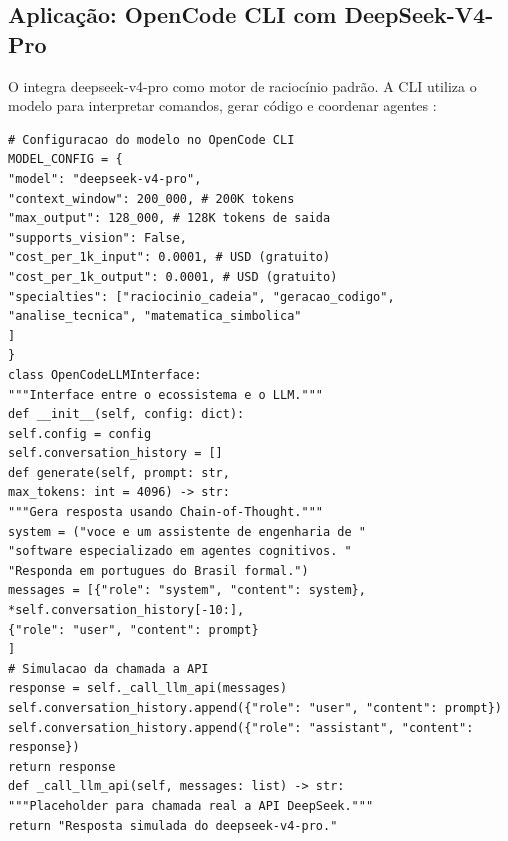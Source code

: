 \subsection{Aplicação: OpenCode CLI com DeepSeek-V4-Pro}
O \opencodeeco{} integra deepseek-v4-pro como motor de raciocínio padrão.
A CLI utiliza o modelo para interpretar comandos, gerar código e coordenar
agentes \cite{opencode2026ecosystem}:
\begin{lstlisting}[style=pythonstyle]
# Configuracao do modelo no OpenCode CLI
MODEL_CONFIG = {
"model": "deepseek-v4-pro",
"context_window": 200_000, # 200K tokens
"max_output": 128_000, # 128K tokens de saida
"supports_vision": False,
"cost_per_1k_input": 0.0001, # USD (gratuito)
"cost_per_1k_output": 0.0001, # USD (gratuito)
"specialties": ["raciocinio_cadeia", "geracao_codigo",
"analise_tecnica", "matematica_simbolica"
]
}
class OpenCodeLLMInterface:
"""Interface entre o ecossistema e o LLM."""
def __init__(self, config: dict):
self.config = config
self.conversation_history = []
def generate(self, prompt: str,
max_tokens: int = 4096) -> str:
"""Gera resposta usando Chain-of-Thought."""
system = ("voce e um assistente de engenharia de "
"software especializado em agentes cognitivos. "
"Responda em portugues do Brasil formal.")
messages = [{"role": "system", "content": system},
*self.conversation_history[-10:],
{"role": "user", "content": prompt}
]
# Simulacao da chamada a API
response = self._call_llm_api(messages)
self.conversation_history.append({"role": "user", "content": prompt})
self.conversation_history.append({"role": "assistant", "content": response})
return response
def _call_llm_api(self, messages: list) -> str:
"""Placeholder para chamada real a API DeepSeek."""
return "Resposta simulada do deepseek-v4-pro."
\end{lstlisting}
